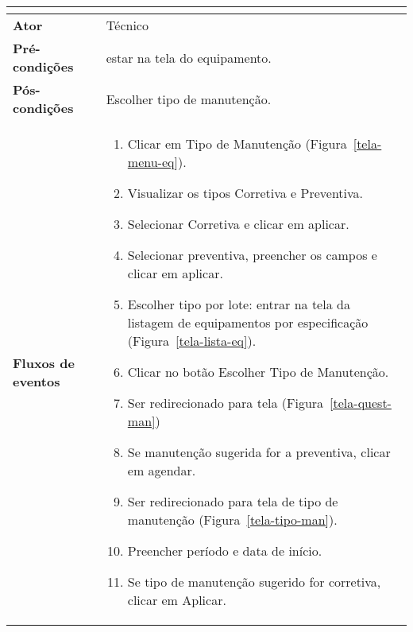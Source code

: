 \begin{apendicesenv}
\begin{table}[H]
\begin{tabular}{ | p{3cm} | p{13cm} |  }
\begin{itemize}
															                    \end{itemize} \\ \hline
	\textbf{Ator} & Técnico \\ \hline
	\textbf{Pré-condições} & estar na tela do equipamento. \\ \hline
	\textbf{Pós-condições} & Escolher tipo de manutenção. \\ \hline
	\textbf{Fluxos de eventos} & \begin{enumerate}
									\item Clicar em Tipo de Manutenção (Figura~\ref{tela-menu-eq}).    
									\item Visualizar os tipos Corretiva e Preventiva.
									\item Selecionar Corretiva e clicar em aplicar.
									\item Selecionar preventiva, preencher os campos e clicar em aplicar.
									\item Escolher tipo por lote: entrar na tela da listagem de equipamentos por especificação (Figura~\ref{tela-lista-eq}).
									\item Clicar no botão Escolher Tipo de Manutenção.
									\item Ser redirecionado para tela (Figura~\ref{tela-quest-man})
									\item Se manutenção sugerida for a preventiva, clicar em agendar.
									\item Ser redirecionado para tela de tipo de manutenção (Figura~\ref{tela-tipo-man}).
									\item Preencher período e data de início.
									\item Se tipo de manutenção sugerido for corretiva, clicar em Aplicar.
								 \end{enumerate}   \\ \hline
\end{tabular}
\end{table}



\end{apendicesenv}

